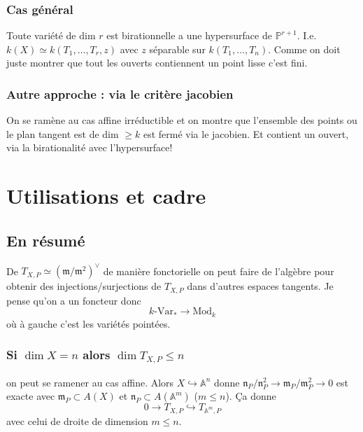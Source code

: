 \documentclass[a4paper,12pt]{book}
\newcommand{\A}{\mathbb{A}}
\newcommand{\m}{\mathfrak{m}}
\newcommand{\n}{\mathfrak{n}}
\renewcommand{\Pr}{\mathbb{P}}
\theoremstyle{plain}
\theoremstyle{definition}
\theoremstyle{remark}
\begin{document}
\subsection{Cas général}
Toute variété de dim $r$ est birationnelle a une hypersurface
de $\Pr^{r+1}$. I.e. $k(X)\simeq k(T_1,\ldots, T_r, z)$ avec $z$
séparable sur $k(T_1,\ldots, T_n)$. Comme on doit juste montrer
que tout les ouverts contiennent un point lisse c'est fini.

\subsection{Autre approche : via le critère jacobien}
On se ramène au cas affine irréductible et on montre que l'ensemble
des points ou le plan tangent est de dim $\geq k$ est fermé via le
jacobien. Et contient un ouvert, via la birationalité avec 
l'hypersurface!

\chapter{Utilisations et cadre}
\section{En résumé}
De $T_{X,P}\simeq (\m/\m^2)^\vee$ de manière fonctorielle on peut
faire de l'algèbre pour obtenir des injections/surjections de 
$T_{X,P}$ dans d'autres espaces tangents. Je pense qu'on a un
foncteur donc 
\[k\textrm{-Var}_*\to \textrm{Mod}_k\]
où à gauche c'est les variétés pointées.

\subsection{Si $\dim X=n$ alors $\dim T_{X,P}\leq n$}
on peut se ramener au cas affine. Alors $X\hookrightarrow \A^n$
donne $\n_P/\n_P^2\to \m_P/\m_P^2\to 0$ est exacte avec
$\m_P\subset A(X)$ et $\n_P\subset A(\A^m)$ ($m\leq n$). Ça donne
\[0\to T_{X,P}\hookrightarrow T_{\A^m,P}\]
avec celui de droite de dimension $m\leq n$.
\end{document}

